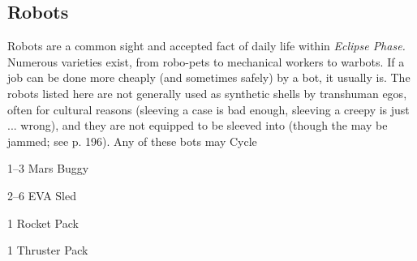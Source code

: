 \subsection{Robots}

Robots are a common sight and accepted fact of daily 
life within \textit{Eclipse Phase.} Numerous varieties exist, 
from robo-pets to mechanical workers to warbots. 
If a job can be done more cheaply (and sometimes 
safely) by a bot, it usually is. The robots listed here 
are not generally used as synthetic shells by transhuman
egos, often for cultural reasons (sleeving a case
is bad enough, sleeving a creepy is just ... wrong), and 
they are not equipped to be sleeved into (though the 
may be jammed; see p. 196). Any of these bots may 
Cycle

1–3
Mars Buggy

2–6
EVA Sled

1
Rocket Pack

1
Thruster Pack

